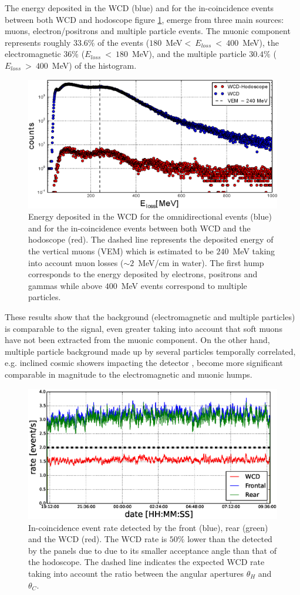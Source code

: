 \documentclass[letterpaper,11pt]{article}
\begin{document}
The energy deposited in the WCD (blue) and for the in-coincidence events between both WCD and hodoscope
figure \ref{fig:WCDHod_rate}, emerge from three main sources: muons, electron/positrons and multiple particle events. The muonic component represents roughly $33.6\%$ of the events ($180$~MeV$<~E_{loss}~<~400$~MeV), the electromagnetic $36$\% ($E_{loss}~<~180$~MeV), and the multiple particle $30.4\%$ ($E_{loss}~>~400$~MeV) of the histogram. 

\begin{figure}
\centering
\includegraphics[width=0.7\columnwidth]{Figures/WCDHod.eps}
\caption{Energy deposited in the WCD for the omnidirectional events (blue) and for the in-coincidence events between both WCD and the hodoscope (red). The dashed line represents the deposited energy of the vertical muons (VEM) which is estimated to be $240$~MeV taking into account muon losses ($\sim 2$~MeV/cm in water). The first hump corresponds to the energy deposited by electrons, positrons and gammas while above $400$~MeV events correspond to multiple particles.}
\label{fig:WCDHod_rate}
\end{figure}

These results show that the background (electromagnetic and multiple particles) is comparable to the signal, even greater taking into account that soft muons have not been extracted from the muonic component. On the other hand, multiple particle background made up by several particles temporally correlated, e.g. inclined cosmic showers impacting the detector \cite{Bonechi2019}, become more significant comparable in magnitude to the electromagnetic and muonic humps.

\begin{figure}[htb]
\centering
\includegraphics[width=0.8\columnwidth]{Figures/HodWCDRate.eps}
\caption{In-coincidence event rate detected by the front (blue), rear (green) and the WCD (red). The WCD rate is $50\%$ lower than the detected by the panels due to due to its smaller acceptance angle than that of the hodoscope. The dashed line indicates the expected WCD rate taking into account the ratio between the angular apertures $\theta_H$ and $\theta_C$.}
\label{fig:RateWCDH}
\end{figure}
\end{document}
